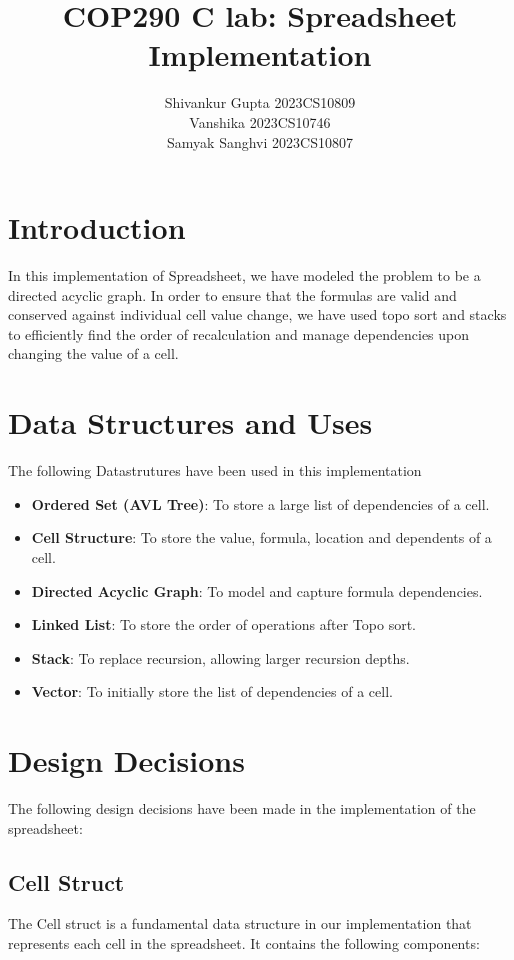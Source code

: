 \documentclass[10pt,a4paper]{article}  %
\title{COP290 C lab: Spreadsheet Implementation}
\author{Shivankur Gupta 2023CS10809\\ Vanshika 2023CS10746\\ Samyak Sanghvi 2023CS10807}
\begin{document}
\maketitle



\tableofcontents

\section{Introduction}
In this implementation of Spreadsheet, we have modeled the problem to be a directed acyclic graph. In order to ensure that the formulas are valid and conserved against individual cell value change, we have used topo sort and stacks to efficiently find the order of recalculation and manage dependencies upon changing the value of a cell.

\section{Data Structures and Uses}
The following Datastrutures have been used in this implementation

\begin{itemize}
    \item \textbf{Ordered Set (AVL Tree)}: To store a large list of dependencies of a cell.
    \item \textbf{Cell Structure}: To store the value, formula, location and dependents of a cell.
    \item \textbf{Directed Acyclic Graph}: To model and capture formula dependencies.
    \item \textbf{Linked List}: To store the order of operations after Topo sort.
    \item \textbf{Stack}: To replace recursion, allowing larger recursion depths.
    \item \textbf{Vector}: To initially store the list of dependencies of a cell.
\end{itemize}



\section{Design Decisions}
The following design decisions have been made in the implementation of the spreadsheet:
\subsection{Cell Struct}
The Cell struct is a fundamental data structure in our implementation that represents each cell in the spreadsheet. It contains the following components:
\end{document}
